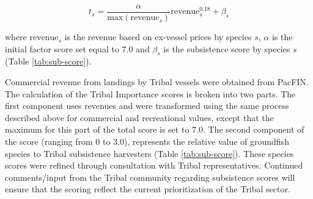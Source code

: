 \documentclass[11pt,
  english,
  a4paper,
]{article}
\begin{document}

\begin{equation}
t_{s} = \frac{\alpha}{\text{max}(\text{revenue}_{s})} \text{revenue}_{s}^{0.18} + \beta_s    
\end{equation}

\leavevmode\tagmcend\tagstructend\par


where {\(\text{revenue}_s\)\leavevmode\tagmcend\tagstructend} is the revenue based on ex-vessel prices by species {\(s\)\leavevmode\tagmcend\tagstructend}, {\(\alpha\)\leavevmode\tagmcend\tagstructend} is the initial factor score set equal to 7.0 and {\(\beta_s\)\leavevmode\tagmcend\tagstructend} is the subsistence score by species {\(s\)\leavevmode\tagmcend\tagstructend} (Table \ref{tab:sub-score}).

\leavevmode\tagmcend\tagstructend\par


Commercial revenue from landings by Tribal vessels were obtained from PacFIN. The calculation of the Tribal Importance scores is broken into two parts. The first component uses revenues and were transformed using the same process described above for commercial and recreational values, except that the maximum for this part of the total score is set to 7.0. The second component of the score (ranging from 0 to 3.0), represents the relative value of groundfish species to Tribal subsistence harvesters (Table \ref{tab:sub-score}). These species scores were refined through consultation with Tribal representatives. Continued comments/input from the Tribal community regarding subsistence scores will ensure that the scoring reflect the current prioritization of the Tribal sector.

\leavevmode\tagmcend\tagstructend\par

\begingroup\fontsize{10}{12}\selectfont
\begingroup\fontsize{10}{12}\selectfont
\end{document}
